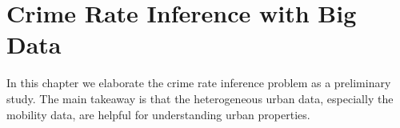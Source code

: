 \chapter{Crime Rate Inference with Big Data}
\label{ch:preliminary}

\newcommand{\textred}[1]{\textcolor{red}{#1}}
\newcommand{\nop}[1]{}

In this chapter we elaborate the crime rate inference problem as a preliminary study. The main takeaway is that the heterogeneous urban data, especially the mobility data, are helpful for understanding urban properties.






